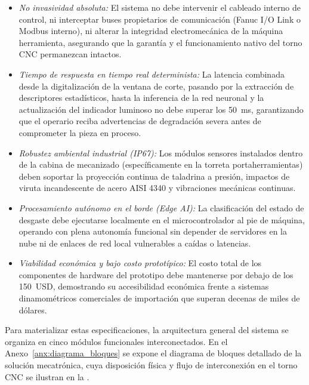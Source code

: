 \begin{itemize}
    \item \textit{No invasividad absoluta:} El sistema no debe intervenir el cableado interno de control, ni interceptar buses propietarios de comunicación (Fanuc I/O Link o Modbus interno), ni alterar la integridad electromecánica de la máquina herramienta, asegurando que la garantía y el funcionamiento nativo del torno CNC permanezcan intactos.
    \item \textit{Tiempo de respuesta en tiempo real determinista:} La latencia combinada desde la digitalización de la ventana de corte, pasando por la extracción de descriptores estadísticos, hasta la inferencia de la red neuronal y la actualización del indicador luminoso no debe superar los 50~ms, garantizando que el operario reciba advertencias de degradación severa antes de comprometer la pieza en proceso.
    \item \textit{Robustez ambiental industrial (IP67):} Los módulos sensores instalados dentro de la cabina de mecanizado (específicamente en la torreta portaherramientas) deben soportar la proyección continua de taladrina a presión, impactos de viruta incandescente de acero AISI 4340 y vibraciones mecánicas continuas.
    \item \textit{Procesamiento autónomo en el borde (Edge AI):} La clasificación del estado de desgaste debe ejecutarse localmente en el microcontrolador al pie de máquina, operando con plena autonomía funcional sin depender de servidores en la nube ni de enlaces de red local vulnerables a caídas o latencias.
    \item \textit{Viabilidad económica y bajo costo prototípico:} El costo total de los componentes de hardware del prototipo debe mantenerse por debajo de los 150~USD, demostrando su accesibilidad económica frente a sistemas dinamométricos comerciales de importación que superan decenas de miles de dólares.
\end{itemize}

Para materializar estas especificaciones, la arquitectura general del sistema se organiza en cinco módulos funcionales interconectados. En el Anexo~\ref{anx:diagrama_bloques} se expone el diagrama de bloques detallado de la solución mecatrónica, cuya disposición física y flujo de interconexión en el torno CNC se ilustran en la .


